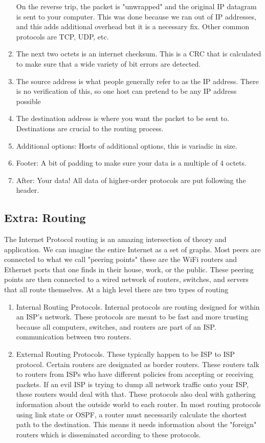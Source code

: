 \begin{enumerate}
    On the reverse trip, the packet is "unwrapped" and the original IP datagram is sent to your computer.
    This was done because we ran out of IP addresses, and this adds additional overhead but it is a necessary fix.
    Other common protocols are TCP, UDP, etc.
  \item The next two octets is an internet checksum.
    This is a CRC that is calculated to make sure that a wide variety of bit errors are detected.
  \item The source address is what people generally refer to as the IP address.
    There is no verification of this, so one host can pretend to be any IP address possible
  \item The destination address is where you want the packet to be sent to.
    Destinations are crucial to the routing process.
  \item Additional options: Hosts of additional options, this is variadic in size.
  \item Footer: A bit of padding to make sure your data is a multiple of 4 octets.
  \item After: Your data! All data of higher-order protocols are put following the header.
\end{enumerate}

\subsection{Extra: Routing}

The Internet Protocol routing is an amazing intersection of theory and application.
We can imagine the entire Internet as a set of graphs.
Most peers are connected to what we call "peering points" these are the WiFi routers and Ethernet ports that one finds in their house, work, or the public.
These peering points are then connected to a wired network of routers, switches, and servers that all route themselves.
At a high level there are two types of routing

\begin{enumerate}
\item Internal Routing Protocols.
  Internal protocols are routing designed for within an ISP's network.
  These protocols are meant to be fast and more trusting because all computers, switches, and routers are part of an ISP.
  communication between two routers.
\item External Routing Protocols.
  These typically happen to be ISP to ISP protocol.
  Certain routers are designated as border routers.
  These routers talk to routers from ISPs who have different policies from accepting or receiving packets.
  If an evil ISP is trying to dump all network traffic onto your ISP, these routers would deal with that.
  These protocols also deal with gathering information about the outside world to each router.
  In most routing protocols using link state or OSPF, a router must necessarily calculate the shortest path to the destination.
  This means it needs information about the "foreign" routers which is disseminated according to these protocols.
\end{enumerate}

